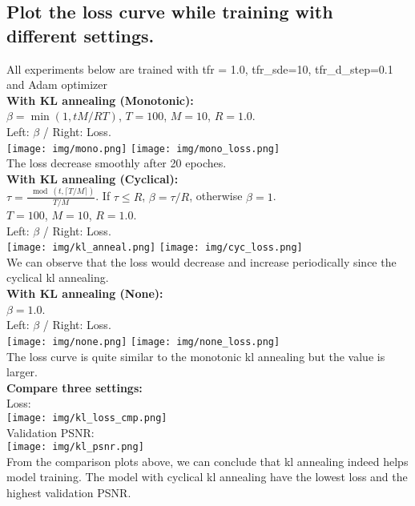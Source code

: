 \documentclass{article} %
\begin{document}
    \subsection{Plot the loss curve while training with different settings.}
    All experiments below are trained with tfr = 1.0, tfr\_sde=10, tfr\_d\_step=0.1 and Adam optimizer\\
    \textbf{With KL annealing (Monotonic):}\\
    $\beta = \min(1, tM/RT)$, $T = 100$, $M = 10$, $R = 1.0$.\\
    Left: $\beta$ / Right: Loss.\\
    \texttt{[image: img/mono.png]}
    \texttt{[image: img/mono\_loss.png]} \\
    The loss decrease smoothly after 20 epoches.\\
    \textbf{With KL annealing (Cyclical):}\\
    $\tau = \frac{\mod(t, \lceil T/M \rceil)}{T/M}$. If $\tau \leq R$, $\beta = \tau / R$, otherwise $\beta = 1$.\\
    $T = 100$, $M = 10$, $R = 1.0$.\\
    Left: $\beta$ / Right: Loss.\\
    \texttt{[image: img/kl\_anneal.png]}
    \texttt{[image: img/cyc\_loss.png]} \\
    We can observe that the loss would decrease and increase periodically since the cyclical kl annealing.\\
    \textbf{With KL annealing (None):}\\
    $\beta = 1.0$.\\
    Left: $\beta$ / Right: Loss.\\
    \texttt{[image: img/none.png]}
    \texttt{[image: img/none\_loss.png]} \\
    The loss curve is quite similar to the monotonic kl annealing but the value is larger.\\
    \textbf{Compare three settings:}\\
    Loss:\\
    \texttt{[image: img/kl\_loss\_cmp.png]}\\
    Validation PSNR:\\
    \texttt{[image: img/kl\_psnr.png]}\\
    From the comparison plots above, we can conclude that kl annealing indeed helps model training.
    The model with cyclical kl annealing have the lowest loss and the highest validation PSNR.\\
\end{document}
